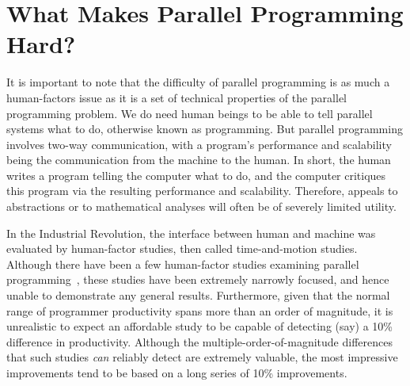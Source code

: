 
\section{What Makes Parallel Programming Hard?}
\label{sec:intro:What Makes Parallel Programming Hard?}


It is important to note that the difficulty of parallel programming
is as much a human-factors issue as it is a set of technical properties of the
parallel programming problem.
We do need human beings to be able to tell parallel
systems what to do, otherwise known as programming.
But parallel programming involves two-way communication, with
a program's performance and scalability being the communication from
the machine to the human.
In short, the human writes a program telling the computer what to do,
and the computer critiques this program via the resulting performance and
scalability.
Therefore, appeals to abstractions or to mathematical analyses will
often be of severely limited utility.

In the Industrial Revolution, the interface between human and machine
was evaluated by human-factor studies, then called time-and-motion
studies.
Although there have been a few human-factor studies examining parallel
programming~\cite{RyanEccles2005HPCSNovice,RyanEccles2006HPCSNoviceNeeds,
LorinHochstein2005SC,DuaneSzafron1994PEMPDS}, these studies have
been extremely narrowly focused, and hence unable to demonstrate any
general results.
Furthermore, given that the normal range of programmer productivity
spans more than an order of magnitude, it is unrealistic to expect
an affordable study to be capable of detecting (say) a 10\% difference
in productivity.
Although the multiple-order-of-magnitude differences that such studies
\emph{can} reliably detect are extremely valuable, the most impressive
improvements tend to be based on a long series of 10\% improvements.

